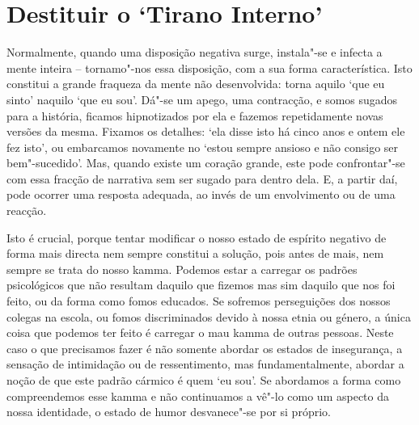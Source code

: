 \section{Destituir o `Tirano Interno'}

Normalmente, quando uma disposição negativa surge, instala"-se e infecta a mente
inteira -- tornamo"-nos essa disposição, com a sua forma característica. Isto
constitui a grande fraqueza da mente não desenvolvida: torna aquilo `que eu
sinto' naquilo `que eu sou'. Dá"-se um apego, uma contracção, e somos sugados
para a história, ficamos hipnotizados por ela e fazemos repetidamente novas
versões da mesma. Fixamos os detalhes: `ela disse isto há cinco anos e ontem ele
fez isto', ou embarcamos novamente no `estou sempre ansioso e não consigo ser
bem"-sucedido'. Mas, quando existe um coração grande, este pode confrontar"-se com
essa fracção de narrativa sem ser sugado para dentro dela. E, a partir daí, pode
ocorrer uma resposta adequada, ao invés de um envolvimento ou de uma reacção.

\enlargethispage{\baselineskip}

Isto é crucial, porque tentar modificar o nosso estado de espírito negativo de
forma mais directa nem sempre constitui a solução, pois antes de mais, nem
sempre se trata do nosso kamma. Podemos estar a carregar os padrões psicológicos
que não resultam daquilo que fizemos mas sim daquilo que nos foi feito, ou da
forma como fomos educados. Se sofremos perseguições dos nossos colegas na
escola, ou fomos discriminados devido à nossa etnia ou género, a única coisa que
podemos ter feito é carregar o mau kamma de outras pessoas. Neste caso o que
precisamos fazer é não somente abordar os estados de insegurança, a sensação de
intimidação ou de ressentimento, mas fundamentalmente, abordar a noção de que
este padrão cármico é quem `eu sou'. Se abordamos a forma como compreendemos
esse kamma e não continuamos a vê"-lo como um aspecto da nossa identidade, o
estado de humor desvanece"-se por si próprio.

\enlargethispage{\baselineskip}

